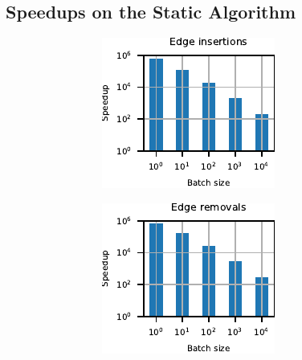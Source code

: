 \subsection{Speedups on the Static Algorithm}
\label{sec:dyn-mwm:speedups-batch-single}

\begin{figure}[t]
\centering
\begin{subfigure}[b]{.5\textwidth}
\begin{subfigure}[b]{.5\textwidth}
\centering
\includegraphics[width=.9\textwidth]{sources/plots/dyn-mwm/speedup-road-insertion.pdf}
\end{subfigure}\hfill
\begin{subfigure}[b]{.5\textwidth}
\centering
\includegraphics[width=.9\textwidth]{sources/plots/dyn-mwm/speedup-road-removal.pdf}

\end{subfigure}
\end{subfigure}
\end{figure}
